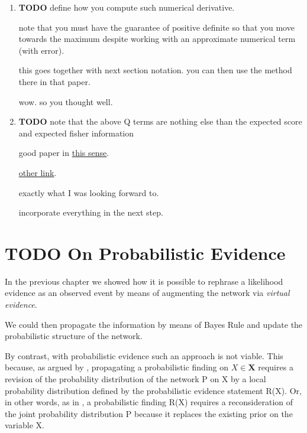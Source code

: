\documentclass[11pt]{article}
\begin{document}
\begin{enumerate}
\item {\bfseries\sffamily TODO} define how you compute such numerical derivative.
\label{sec:orgafdb0bf}

note that you must have the guarantee of positive definite so that
you move towards the maximum despite working with an approximate
numerical term (with error).

this goes together with next section notation. you can then use the
method there in that paper.

wow. so you thought well.


\item {\bfseries\sffamily TODO} note that the above Q terms are nothing else than the expected score and expected fisher information
\label{sec:org95b6d09}

good paper in \href{https://arxiv.org/pdf/1608.01734.pdf}{this sense}.

\href{https://scholar.google.com/scholar?q=Method\%20for\%20Computation\%20of\%20the\%20Fisher\%20Information\%20Matrix\%20in\%20the\%20Expectation\%2DMaximization\%20Algorithm\&btnG=Search\&as\_sdt=800000000001\&as\_sdtp=on}{other link}.

exactly what I was looking forward to.

incorporate everything in the next step.
\end{enumerate}


\section{{\bfseries\sffamily TODO} On Probabilistic Evidence}
\label{sec:org69e2946}

In the previous chapter we showed how it is possible to rephrase a
likelihood evidence as an observed event by means of augmenting the
network via \emph{virtual evidence}.

We could then propagate the information by means of Bayes Rule
and update the probabilistic structure of the network.

By contrast, with probabilistic evidence such an approach is not
viable. This because, as argued by \cite{PENG_2010}, propagating a
probabilistic finding on \(X \in \textbf{X}\) requires a revision of
the probability distribution of the network P on X by a local
probability distribution defined by the probabilistic evidence
statement R(X). Or, in other words, as in \cite{Mrad_2015}, a
probabilistic finding R(X) requires a reconsideration of the joint
probability distribution P because it replaces the existing prior on
the variable X.
\end{document}
